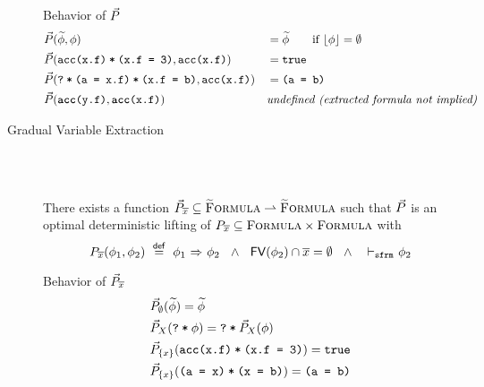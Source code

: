 \begin{description}
    \begin{example}{Behavior of $\vec{P}$}
        \begin{alignat*}{3}
        	 & \vec{P}(\widetilde{\phi}, \phi)            && = \widetilde{\phi}    \quad\quad \text{if } \lfloor\phi\rfloor = \emptyset & ~ \\
             & \vec{P}(\textup{\texttt{acc(x.f)\:*\:(x.f = 3)}}, \textup{\texttt{acc(x.f)}}) && = \textup{\texttt{true}}                                         & \\
             & \vec{P}(\textup{\texttt{?\:*\:(a = x.f)\:*\:(x.f = b)}}, \textup{\texttt{acc(x.f)}}) && = \textup{\texttt{(a = b)}}                                        & \\
        	 & \vec{P}(\textup{\texttt{\textbf{acc}(y.f)}}, \textup{\texttt{\textbf{acc}(x.f)}}) && \textit{undefined (extracted formula not implied)}                 &
        \end{alignat*}
    \end{example}
    
    \item[Gradual Variable Extraction]\label{lemma:var-extr}~\\
    \begin{lemma}~\\
        There exists a function $\vec{P}_{\overline{x}} \subseteq \textup{\textsc{\ensuremath{\widetilde{\text{F}}}ormula}} \rightharpoonup \textup{\textsc{\ensuremath{\widetilde{\text{F}}}ormula}}$ such that
        $\vec{P}$ is an optimal deterministic lifting of $P_{\overline{x}} \subseteq \textup{\textsc{Formula}} \times \textup{\textsc{Formula}}$ with
        $$P_{\overline{x}}(\phi_1, \phi_2) ~\overset{\textup{\textmd{\textsf{def}}}}{=}~ {\phi_1} \,\,{\Rightarrow}\,\, {\phi_2} ~~\wedge~~ \textup{\textmd{\textsf{FV}}}(\phi_2) \cap \overline{x} = \emptyset ~~\wedge~~ \,\,{\vdash_\texttt{sfrm}}\,\, \phi_2$$
    \end{lemma}
    
    \begin{example}{Behavior of $\vec{P}_{\overline{x}}$}
        \begin{align*}
        &\vec{P}_{\emptyset}(\widetilde{\phi}) = \widetilde{\phi}\\
        &\vec{P}_{X}(\textup{\texttt{\textup{\texttt{?}}\:*\:\ensuremath{\phi}}}) = \textup{\texttt{\textup{\texttt{?}}\:*\:\ensuremath{\vec{P}_{X}(\phi)}}}\\
        &\vec{P}_{\{x\}}(\textup{\texttt{acc(x.f)\:*\:(x.f = 3)}}) = \textup{\texttt{true}}\\
        &\vec{P}_{\{x\}}(\textup{\texttt{(a = x)\:*\:(x = b)}}) = \textup{\texttt{(a = b)}}
        \end{align*}
    \end{example}
\end{description}